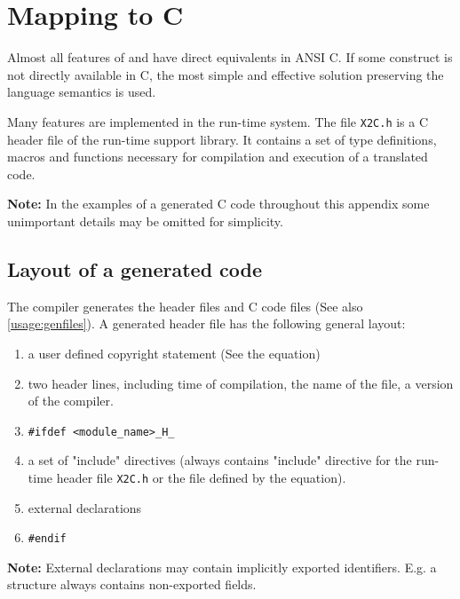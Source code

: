 \chapter{Mapping to C}\label{maptoc}

Almost all features of \mt{} and \ot{} have direct equivalents in
ANSI C. If some construct is not directly available in C, the
most simple and effective solution preserving the language
semantics is used.

Many features are implemented in the run-time system. The file
{\tt X2C.h} is a C header file of the run-time
support library. It contains a set of type definitions, macros
and  functions  necessary for compilation and execution of
a translated code.

{\bf Note:} In the examples of a generated C code throughout this
appendix some unimportant details may be omitted for simplicity.

\section{Layout of a generated code}\label{maptoc:layout}

The compiler generates the header files and C code files (See also
\ref{usage:genfiles}). A generated header file has the
following general layout:
\begin{enumerate}
\item   a user defined copyright statement (See the 
        equation)

\item   two header lines, including time of compilation,
        the name of the file, a version of the \xds{} compiler.

\item   \verb+#ifdef <module_name>_H_+

\item   a set of "include" directives (always contains "include" directive
        for the run-time header file {\tt X2C.h} or the file defined by 
        the  equation).

\item   external declarations

\item   \verb+#endif+

\end{enumerate}

{\bf  Note:}  External declarations may contain implicitly
exported identifiers. E.g. a structure always contains
non-exported fields.

